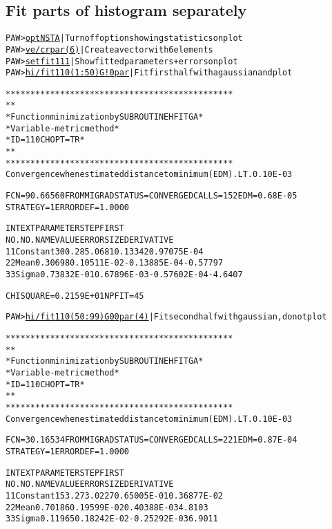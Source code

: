 \subsection*{Fit parts of histogram separately}
\begin{alltt}
PAW > \underline{opt NSTA}                        | Turn off option showing statistics on plot
PAW > \underline{ve/cr par(6)}                    | Create a vector with 6 elements
PAW > \underline{set fit 111}                     | Show fitted parameters + errors on plot
PAW > \underline{hi/fit 110(1:50) G ! 0 par}      | Fit first half with a gaussian and plot
 
    **********************************************
    *                                            *
    * Function minimization by SUBROUTINE HFITGA *
    * Variable-metric method                     *
    * ID =        110  CHOPT = TR                *
    *                                            *
    **********************************************
Convergence when estimated distance to minimum (EDM) .LT.  0.10E-03
 
FCN=   90.66560     FROM MIGRAD    STATUS=CONVERGED  CALLS=  152 EDM=  0.68E-05
                    STRATEGY= 1    ERROR DEF=    1.0000
 
INT EXT  PARAMETER                                   STEP         FIRST
NO. NO.    NAME        VALUE          ERROR          SIZE      DERIVATIVE
  1  1  Constant      300.28        5.0681       0.13342       0.97075E-04
  2  2  Mean         0.30698       0.10511E-02  -0.13885E-04  -0.57797
  3  3  Sigma        0.73832E-01   0.67896E-03  -0.57602E-04   -4.6407
 
CHISQUARE = 0.2159E+01  NPFIT =   45
 
PAW > \underline{hi/fit 110(50:99) G 0 0 par(4)}  | Fit second half with gaussian, do not plot
 
    **********************************************
    *                                            *
    * Function minimization by SUBROUTINE HFITGA *
    * Variable-metric method                     *
    * ID =        110  CHOPT = TR                *
    *                                            *
    **********************************************
Convergence when estimated distance to minimum (EDM) .LT.  0.10E-03
 
FCN=   30.16534     FROM MIGRAD    STATUS=CONVERGED  CALLS=  221 EDM=  0.87E-04
                    STRATEGY= 1    ERROR DEF=    1.0000
 
INT EXT  PARAMETER                                   STEP         FIRST
NO. NO.    NAME        VALUE          ERROR          SIZE      DERIVATIVE
  1  1  Constant      153.27        3.0227       0.65005E-01   0.36877E-02
  2  2  Mean         0.70186       0.19599E-02   0.40388E-03    4.8103
  3  3  Sigma        0.11965       0.18242E-02  -0.25292E-03    6.9011
 

\end{alltt}
